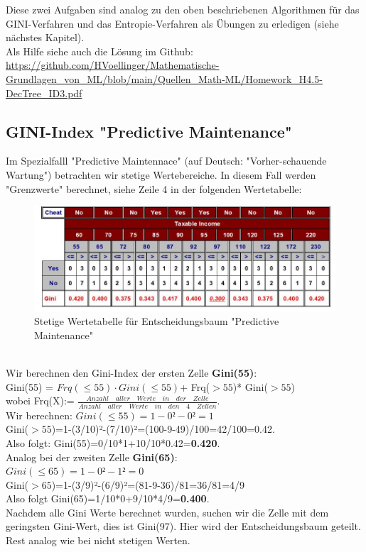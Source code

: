 \documentclass[12pt]{article}
\begin{document}
%
Diese zwei Aufgaben sind analog zu den oben beschriebenen Algorithmen für das GINI-Verfahren und das Entropie-Verfahren als Übungen zu erledigen (siehe nächstes Kapitel).\\[0.2cm]
%
Als Hilfe siehe auch die Lösung im Github:\\ 
\url{https://github.com/HVoellinger/Mathematische-Grundlagen_von_ML/blob/main/Quellen_Math-ML/Homework_H4.5-DecTree_ID3.pdf}
%
\subsection{GINI-Index "Predictive Maintenance"}
Im Spezialfalll "Predictive Maintennace" (auf Deutsch: "Vorher-schauende Wartung") betrachten wir stetige Wertebereiche. In diesem Fall werden "Grenzwerte" berechnet, siehe Zeile 4 in der folgenden Wertetabelle:\\[0.4cm]
\begin{figure}[htp]
  \centering
  \hspace*{-0.9cm} 
  \includegraphics[width=1.20\textwidth]{stetige Wertematrix}
  \caption{Stetige Wertetabelle für Entscheidungsbaum "Predictive Maintenance"}     
  \label{fig:Steige-Wertetabelle}
\end{figure}
\\[0.4cm]   
%
Wir berechnen den Gini-Index der ersten Zelle \textbf{Gini(55)}:\\[0.2cm]
%
Gini(55) = $Frq(\leq 55)\cdot Gini(\leq 55)$+ Frq($ > 55$)* Gini($ > 55$)\\
%
wobei Frq(X):= $\frac{Anzahl \quad aller \quad Werte \quad in \quad der \quad  Zelle}{Anzahl \quad aller \quad Werte \quad in \quad den \quad 4 \quad Zellen}$.\\[0.2cm]
Wir berechnen:  $Gini(\leq 55)=1-0²-0²=1$ \\
Gini($ > 55$)=1-(3/10)²-(7/10)²=(100-9-49)/100=42/100=0.42.\\
Also folgt: Gini(55)=0/10*1+10/10*0.42=\textbf{0.420}.\\[0.3cm]
Analog bei der zweiten Zelle \textbf{Gini(65)}: \\
$Gini(\le 65)=1-0²-1²=0$\\
Gini($ > 65$)=1-(3/9)²-(6/9)²=(81-9-36)/81=36/81=4/9\\
Also folgt Gini(65)=1/10*0+9/10*4/9=\textbf{0.400}.\\[0.3cm]
Nachdem alle Gini Werte berechnet wurden, suchen wir die Zelle mit dem geringsten Gini-Wert, dies ist Gini(97). Hier wird der Entscheidungsbaum geteilt. \\
Rest analog wie bei nicht stetigen Werten.\\[0.2cm]
\end{document}
